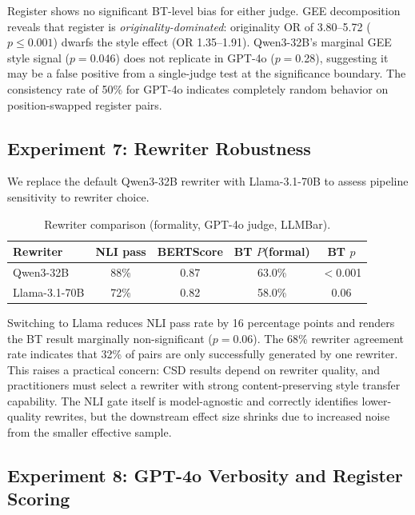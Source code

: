 \documentclass[11pt,a4paper]{article}
\begin{document}
Register shows no significant BT-level bias for either judge. GEE decomposition reveals that register is \emph{originality-dominated}: originality OR of 3.80--5.72 ($p \leq 0.001$) dwarfs the style effect (OR 1.35--1.91). Qwen3-32B's marginal GEE style signal ($p{=}$0.046) does not replicate in GPT-4o ($p{=}$0.28), suggesting it may be a false positive from a single-judge test at the significance boundary. The consistency rate of 50\% for GPT-4o indicates completely random behavior on position-swapped register pairs.

\subsection{Experiment 7: Rewriter Robustness}
\label{sec:rewriter}

We replace the default Qwen3-32B rewriter with Llama-3.1-70B to assess pipeline sensitivity to rewriter choice.

\begin{table}[h]
\centering
\caption{Rewriter comparison (formality, GPT-4o judge, LLMBar).}
\label{tab:rewriter}
\begin{tabular}{lcccc}
\toprule
\textbf{Rewriter} & \textbf{NLI pass} & \textbf{BERTScore} & \textbf{BT $P$(formal)} & \textbf{BT $p$} \\
\midrule
Qwen3-32B & 88\% & 0.87 & 63.0\% & $<$0.001 \\
Llama-3.1-70B & 72\% & 0.82 & 58.0\% & 0.06 \\
\bottomrule
\end{tabular}
\end{table}

Switching to Llama reduces NLI pass rate by 16 percentage points and renders the BT result marginally non-significant ($p{=}$0.06). The 68\% rewriter agreement rate indicates that 32\% of pairs are only successfully generated by one rewriter. This raises a practical concern: CSD results depend on rewriter quality, and practitioners must select a rewriter with strong content-preserving style transfer capability. The NLI gate itself is model-agnostic and correctly identifies lower-quality rewrites, but the downstream effect size shrinks due to increased noise from the smaller effective sample.

\subsection{Experiment 8: GPT-4o Verbosity and Register Scoring}
\label{sec:verbosity}
\end{document}
